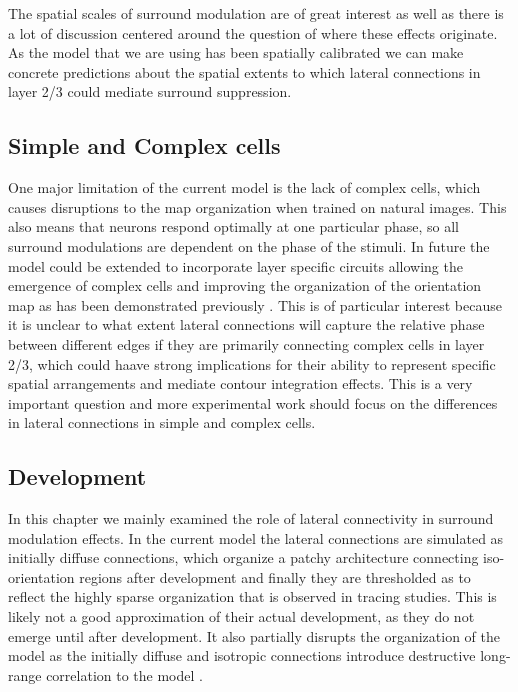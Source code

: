 The spatial scales of surround modulation are of great interest as
well as there is a lot of discussion centered around the question of
where these effects originate. As the model that we are using has been
spatially calibrated we can make concrete predictions about the
spatial extents to which lateral connections in layer 2/3 could
mediate surround suppression.

\subsection{Simple and Complex cells}

One major limitation of the current model is the lack of complex
cells, which causes disruptions to the map organization when trained
on natural images. This also means that neurons respond optimally at
one particular phase, so all surround modulations are dependent on the
phase of the stimuli. In future the model could be extended to
incorporate layer specific circuits allowing the emergence of complex
cells and improving the organization of the orientation map as has
been demonstrated previously \citep{Antolik2010}. This is of
particular interest because it is unclear to what extent lateral
connections will capture the relative phase between different edges if
they are primarily connecting complex cells in layer 2/3, which could
haave strong implications for their ability to represent specific
spatial arrangements and mediate contour integration effects. This is
a very important question and more experimental work should focus on
the differences in lateral connections in simple and complex cells.

\subsection{Development}

In this chapter we mainly examined the role of lateral connectivity in
surround modulation effects. In the current model the lateral
connections are simulated as initially diffuse connections, which
organize a patchy architecture connecting iso-orientation regions
after development and finally they are thresholded as to reflect the
highly sparse organization that is observed in tracing studies. This
is likely not a good approximation of their actual development, as
they do not emerge until after development. It also partially disrupts
the organization of the model as the initially diffuse and isotropic
connections introduce destructive long-range correlation to the model
\citep{Miikkulainen2005}.

